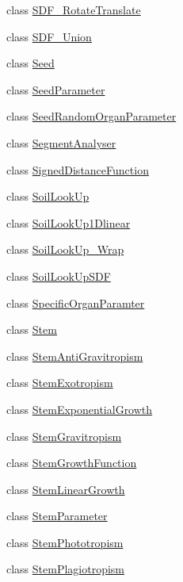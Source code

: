 \begin{DoxyCompactItemize}
\item 
class \hyperlink{classCPlantBox_1_1SDF__RotateTranslate}{S\+D\+F\+\_\+\+Rotate\+Translate}
\item 
class \hyperlink{classCPlantBox_1_1SDF__Union}{S\+D\+F\+\_\+\+Union}
\item 
class \hyperlink{classCPlantBox_1_1Seed}{Seed}
\item 
class \hyperlink{classCPlantBox_1_1SeedParameter}{Seed\+Parameter}
\item 
class \hyperlink{classCPlantBox_1_1SeedRandomOrganParameter}{Seed\+Random\+Organ\+Parameter}
\item 
class \hyperlink{classCPlantBox_1_1SegmentAnalyser}{Segment\+Analyser}
\item 
class \hyperlink{classCPlantBox_1_1SignedDistanceFunction}{Signed\+Distance\+Function}
\item 
class \hyperlink{classCPlantBox_1_1SoilLookUp}{Soil\+Look\+Up}
\item 
class \hyperlink{classCPlantBox_1_1SoilLookUp1Dlinear}{Soil\+Look\+Up1\+Dlinear}
\item 
class \hyperlink{classCPlantBox_1_1SoilLookUp__Wrap}{Soil\+Look\+Up\+\_\+\+Wrap}
\item 
class \hyperlink{classCPlantBox_1_1SoilLookUpSDF}{Soil\+Look\+Up\+S\+DF}
\item 
class \hyperlink{classCPlantBox_1_1SpecificOrganParamter}{Specific\+Organ\+Paramter}
\item 
class \hyperlink{classCPlantBox_1_1Stem}{Stem}
\item 
class \hyperlink{classCPlantBox_1_1StemAntiGravitropism}{Stem\+Anti\+Gravitropism}
\item 
class \hyperlink{classCPlantBox_1_1StemExotropism}{Stem\+Exotropism}
\item 
class \hyperlink{classCPlantBox_1_1StemExponentialGrowth}{Stem\+Exponential\+Growth}
\item 
class \hyperlink{classCPlantBox_1_1StemGravitropism}{Stem\+Gravitropism}
\item 
class \hyperlink{classCPlantBox_1_1StemGrowthFunction}{Stem\+Growth\+Function}
\item 
class \hyperlink{classCPlantBox_1_1StemLinearGrowth}{Stem\+Linear\+Growth}
\item 
class \hyperlink{classCPlantBox_1_1StemParameter}{Stem\+Parameter}
\item 
class \hyperlink{classCPlantBox_1_1StemPhototropism}{Stem\+Phototropism}
\item 
class \hyperlink{classCPlantBox_1_1StemPlagiotropism}{Stem\+Plagiotropism}

\end{DoxyCompactItemize}
